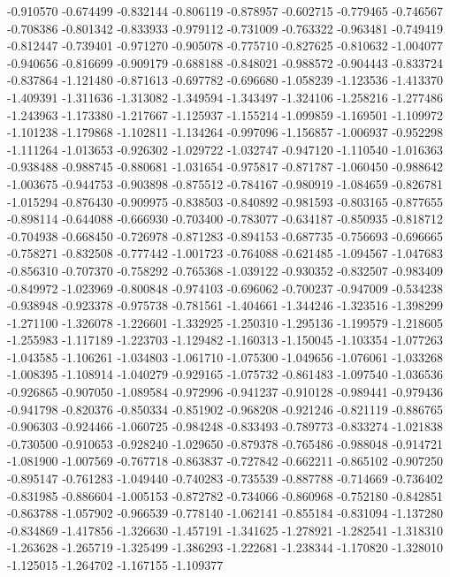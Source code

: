 -0.910570
-0.674499
-0.832144
-0.806119
-0.878957
-0.602715
-0.779465
-0.746567
-0.708386
-0.801342
-0.833933
-0.979112
-0.731009
-0.763322
-0.963481
-0.749419
-0.812447
-0.739401
-0.971270
-0.905078
-0.775710
-0.827625
-0.810632
-1.004077
-0.940656
-0.816699
-0.909179
-0.688188
-0.848021
-0.988572
-0.904443
-0.833724
-0.837864
-1.121480
-0.871613
-0.697782
-0.696680
-1.058239
-1.123536
-1.413370
-1.409391
-1.311636
-1.313082
-1.349594
-1.343497
-1.324106
-1.258216
-1.277486
-1.243963
-1.173380
-1.217667
-1.125937
-1.155214
-1.099859
-1.169501
-1.109972
-1.101238
-1.179868
-1.102811
-1.134264
-0.997096
-1.156857
-1.006937
-0.952298
-1.111264
-1.013653
-0.926302
-1.029722
-1.032747
-0.947120
-1.110540
-1.016363
-0.938488
-0.988745
-0.880681
-1.031654
-0.975817
-0.871787
-1.060450
-0.988642
-1.003675
-0.944753
-0.903898
-0.875512
-0.784167
-0.980919
-1.084659
-0.826781
-1.015294
-0.876430
-0.909975
-0.838503
-0.840892
-0.981593
-0.803165
-0.877655
-0.898114
-0.644088
-0.666930
-0.703400
-0.783077
-0.634187
-0.850935
-0.818712
-0.704938
-0.668450
-0.726978
-0.871283
-0.894153
-0.687735
-0.756693
-0.696665
-0.758271
-0.832508
-0.777442
-1.001723
-0.764088
-0.621485
-1.094567
-1.047683
-0.856310
-0.707370
-0.758292
-0.765368
-1.039122
-0.930352
-0.832507
-0.983409
-0.849972
-1.023969
-0.800848
-0.974103
-0.696062
-0.700237
-0.947009
-0.534238
-0.938948
-0.923378
-0.975738
-0.781561
-1.404661
-1.344246
-1.323516
-1.398299
-1.271100
-1.326078
-1.226601
-1.332925
-1.250310
-1.295136
-1.199579
-1.218605
-1.255983
-1.117189
-1.223703
-1.129482
-1.160313
-1.150045
-1.103354
-1.077263
-1.043585
-1.106261
-1.034803
-1.061710
-1.075300
-1.049656
-1.076061
-1.033268
-1.008395
-1.108914
-1.040279
-0.929165
-1.075732
-0.861483
-1.097540
-1.036536
-0.926865
-0.907050
-1.089584
-0.972996
-0.941237
-0.910128
-0.989441
-0.979436
-0.941798
-0.820376
-0.850334
-0.851902
-0.968208
-0.921246
-0.821119
-0.886765
-0.906303
-0.924466
-1.060725
-0.984248
-0.833493
-0.789773
-0.833274
-1.021838
-0.730500
-0.910653
-0.928240
-1.029650
-0.879378
-0.765486
-0.988048
-0.914721
-1.081900
-1.007569
-0.767718
-0.863837
-0.727842
-0.662211
-0.865102
-0.907250
-0.895147
-0.761283
-1.049440
-0.740283
-0.735539
-0.887788
-0.714669
-0.736402
-0.831985
-0.886604
-1.005153
-0.872782
-0.734066
-0.860968
-0.752180
-0.842851
-0.863788
-1.057902
-0.966539
-0.778140
-1.062141
-0.855184
-0.831094
-1.137280
-0.834869
-1.417856
-1.326630
-1.457191
-1.341625
-1.278921
-1.282541
-1.318310
-1.263628
-1.265719
-1.325499
-1.386293
-1.222681
-1.238344
-1.170820
-1.328010
-1.125015
-1.264702
-1.167155
-1.109377
